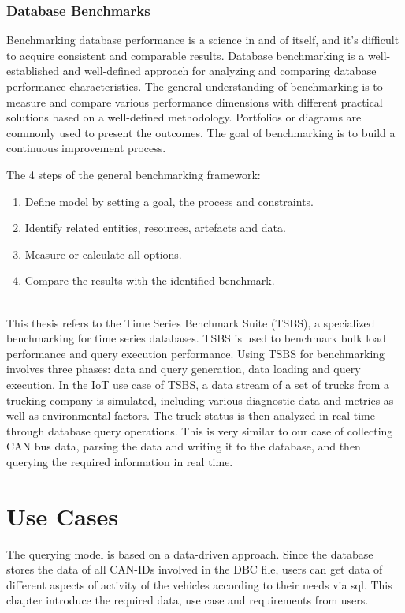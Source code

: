 \subsection{Database Benchmarks}
Benchmarking database performance is a science in and of itself, and it's difficult to acquire consistent and comparable results. Database benchmarking is a well-established and well-defined approach for analyzing and comparing database performance characteristics. The general understanding of benchmarking is to measure and compare various performance dimensions with different practical solutions based on a well-defined methodology. Portfolios or diagrams are commonly used to present the outcomes. The goal of benchmarking is to build a continuous improvement process\cite{benchmarking}.

The 4 steps of the general benchmarking framework:
\begin{enumerate}
    \item Define model by setting a goal, the process and constraints.
    \item Identify related entities, resources, artefacts and data.
    \item Measure or calculate all options.
    \item Compare the results with the identified benchmark\cite{benchmarking}.
\end{enumerate}

~\\
This thesis refers to the Time Series Benchmark Suite (TSBS)\cite{tsbs}, a specialized benchmarking for time series databases. TSBS is used to benchmark bulk load performance and query execution performance. Using TSBS for benchmarking involves three phases: data and query generation, data loading and query execution. In the IoT use case of TSBS, a data stream of a set of trucks from a trucking company is simulated, including various diagnostic data and metrics as well as environmental factors\cite{tsbs}. The truck status is then analyzed in real time through database query operations. This is very similar to our case of collecting CAN bus data, parsing the data and writing it to the database, and then querying the required information in real time.


\chapter{Use Cases}
\label{use_case}
The querying model is based on a data-driven approach. Since the database stores the data of all CAN-IDs involved in the DBC file, users can get data of different aspects of activity of the vehicles according to their needs via sql.
This chapter introduce the required data, use case and requirements from users.

